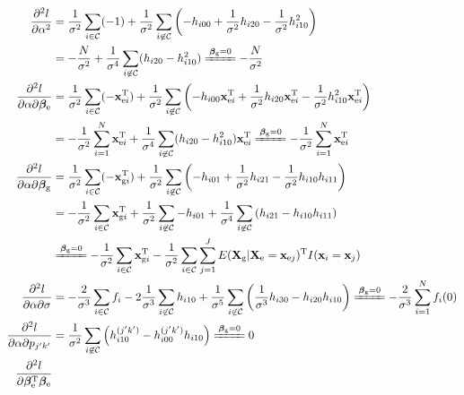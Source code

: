 \documentclass[10pt,a4paper]{article}
\def\bbetag{\bm{\beta}_{\text{g}}}
\def\bbetae{\bm{\beta}_{\text{e}}}
\def\bx{\mathbf{x}}
\def\bxgi{\mathbf{x}_{\text{g}i}}
\def\bxei{\mathbf{x}_{\text{e}i}}
\def\bxej{\mathbf{x}_{\text{e}j}}
\def\bXg{\mathbf{X}_{\text{g}}}
\def\bXe{\mathbf{X}_{\text{e}}}
\begin{document}
\begin{align*}
\frac{\partial^2 l}{\partial \alpha^2} 
&= \frac{1}{\sigma^2}\sum_{i \in \mathcal{C}} (-1) + \frac{1}{\sigma^2} \sum_{i \not \in \mathcal{C}} \left( -h_{i00} + \frac{1}{\sigma^2} h_{i20} - \frac{1}{\sigma^2} h_{i10}^2 \right)\\
& =  -\frac{N}{\sigma^2} + \frac{1}{\sigma^4} \sum_{i \not \in \mathcal{C}} (h_{i20} - h_{i10}^2)  \xlongequal{\bbetag = 0} -\frac{N}{\sigma^2} \\
\frac{\partial^2 l}{\partial \alpha \partial \bbetae} 
&= \frac{1}{\sigma^2}\sum_{i \in \mathcal{C}} (-\bxei^{\text{T}}) + \frac{1}{\sigma^2} \sum_{i \not \in \mathcal{C}} \left( -h_{i00}\bxei^{\text{T}} + \frac{1}{\sigma^2} h_{i20}\bxei^{\text{T}} - \frac{1}{\sigma^2} h_{i10}^2 \bxei^{\text{T}} \right) \\
&=  -\frac{1}{\sigma^2} \sum_{i=1}^N \bxei^{\text{T}} + \frac{1}{\sigma^4} \sum_{i \not \in \mathcal{C}} (h_{i20} - h_{i10}^2)\bxei^{\text{T}} \xlongequal{\bbetag = 0} -\frac{1}{\sigma^2} \sum_{i=1}^N \bxei^{\text{T}} \\
\frac{\partial^2 l}{\partial \alpha \partial \bbetag} 
&= \frac{1}{\sigma^2}\sum_{i \in \mathcal{C}} (-\bxgi^{\text{T}}) + \frac{1}{\sigma^2} \sum_{i \not \in \mathcal{C}} \left( -h_{i01} + \frac{1}{\sigma^2} h_{i21} - \frac{1}{\sigma^2} h_{i10}h_{i11} \right) \\
&= - \frac{1}{\sigma^2}\sum_{i \in \mathcal{C}} \bxgi^{\text{T}} + \frac{1}{\sigma^2} \sum_{i \not \in \mathcal{C}}  -h_{i01}  +  \frac{1}{\sigma^4} \sum_{i \not \in \mathcal{C}} \left(h_{i21} - h_{i10}h_{i11} \right) \\ & \xlongequal{\bbetag = 0} - \frac{1}{\sigma^2}\sum_{i \in \mathcal{C}} \bxgi^{\text{T}} - \frac{1}{\sigma^2}\sum_{i \in \mathcal{C}}\sum_{j=1}^J E(\bXg|\bXe = \bxej)^{\text{T}} I(\bx_i = \bx_j)  \\
\frac{\partial^2 l}{\partial \alpha \partial \sigma} 
&= -\frac{2}{\sigma^3}\sum_{i \in \mathcal{C}} f_i -2 \frac{1}{\sigma^3} \sum_{i \not \in \mathcal{C}} h_{i10} +  \frac{1}{\sigma^5} \sum_{i \not \in \mathcal{C}} \left( \frac{1}{\sigma^3}h_{i30} - h_{i20}h_{i10} \right) \xlongequal{\bbetag = 0}  -\frac{2}{\sigma^3}\sum_{i =1}^N f_i(0) \\
\frac{\partial^2 l}{\partial \alpha \partial p_{j'k'}} 
&= \frac{1}{\sigma^2} \sum_{i \not \in \mathcal{C}} \left( h_{i10}^{(j'k')} - h_{i00}^{(j'k')}h_{i10} \right) \xlongequal{\bbetag = 0}  0 \\
\frac{\partial^2 l}{\partial \bbetae^{\text{T}} \bbetae} 

\end{align*}
\end{document}
